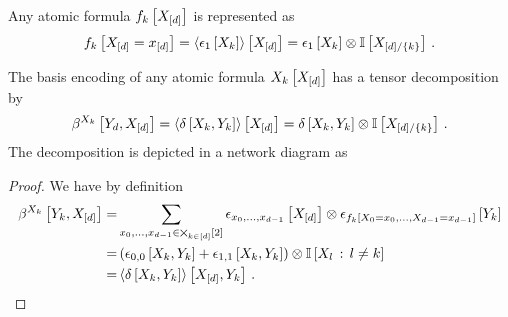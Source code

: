 \begin{theorem}
	Any atomic formula $f_{k}\left[X_{[d]}\right]$ is represented as
	\begin{align*}
		f_{k}\left[X_{[d]}=x_{[d]}\right]
		= \left\langle \epsilon_1\left[X_{k}\right]\right\rangle \left[ X_{[d]} \right]
		= \epsilon_1\left[X_{k}\right] \otimes \mathbb{I}\left[X_{[d]/\{k\}}\right]  \, .
	\end{align*}

	The basis encoding of any atomic formula $X_{k}\left[X_{[d]}\right]$ has a tensor decomposition by
	\begin{align*}
		\beta^{X_{k}}\left[Y_{d},X_{[d]}\right]
		= \left\langle \delta\left[X_{k},Y_{k}\right]\right\rangle \left[ X_{[d]} \right]
		= \delta\left[X_{k},Y_{k}\right] \otimes \mathbb{I}\left[X_{[d]/\{k\}}\right] \, .
	\end{align*}
	The decomposition is depicted in a network diagram as
	\begin{center}
		
	\end{center}
\end{theorem}
\begin{proof}
	We have by definition
	\begin{align*}
		\beta^{X_{k}}\left[Y_{k},X_{[d]}\right]
		=& \sum_{x_{0},\ldots,x_{d-1}\in\bigtimes_{k\in[d]}[2]} \epsilon_{x_{0},\ldots,x_{d-1}}\left[X_{[d]}\right] \otimes \epsilon_{f_{k}\left[X_{0}=x_{0},\ldots,X_{d-1}=x_{d-1}\right]}\left[Y_{k}\right] \\
		=& \left( \epsilon_{0,0}\left[X_{k},Y_{k}\right] +
		\epsilon_{1,1}\left[X_{k},Y_{k}\right] \right) \otimes \mathbb{I}\left[X_{l}\, : \, l \neq k\right] \\
		=& \left\langle \delta\left[X_{k},Y_{k}\right]\right\rangle \left[ X_{[d]},Y_{k} \right] \, .
	\end{align*} 
\end{proof}


